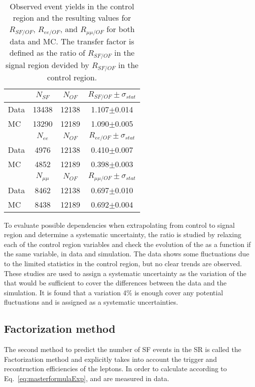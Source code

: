 \begin{table}[ht!]
\def\arraystretch{1.2}
\setlength{\belowcaptionskip}{6pt} 
\small                            
\centering                           
\caption{Observed event yields in the control region and the resulting values for $R_{SF/OF}$, $R_{ee/OF}$, and $R_{\mu\mu/OF}$ for both data and MC. 
The transfer factor is defined as the ratio of $R_{SF/OF}$ in the signal region devided by $R_{SF/OF}$ in the control region.}
\label{tab:rSFOF}
\begin{tabular}{ l c c c}
        \hline \hline
        & $N_{SF}$ & $N_{OF}$ & $ R_{SF/OF} \pm \sigma_{stat}$  \\    
        \hline
         Data & 13438 & 12138 & 1.107$\pm$0.014\\
         MC   & 13290 & 12189 & 1.090$\pm$0.005\\ 
        \hline
         & $N_{ee}$ & $N_{OF}$ & $ R_{ee/OF} \pm \sigma_{stat}$ \\    
        \hline
         Data & 4976 & 12138 & 0.410$\pm$0.007 \\
         MC   & 4852 & 12189 & 0.398$\pm$0.003 \\
        \hline
         & $N_{\mu\mu}$ & $N_{OF}$ & $ R_{\mu\mu/OF} \pm \sigma_{stat}$\\    
        \hline
         Data & 8462 & 12138 & 0.697$\pm$0.010 \\
         MC   & 8438 & 12189 & 0.692$\pm$0.004 \\ \hline\hline
\end{tabular}
\end{table}                                                                                                                                                                    
To evaluate possible dependencies when extrapolating from control to signal region and determine a systematic uncertainty, the ratio \Rsfof is studied by relaxing each of the control region variables and check the evolution of the \Rsfof as a function if the same variable, in data and simulation.  
The data shows some fluctuations due to the limited statistics in the control region, but no clear trends are observed.
These studies are used to assign a systematic uncertainty as the variation of the \Rsfof that would be sufficient to cover the differences between the data and the simulation. 
It is found that a variation 4\% is enough cover any potential fluctuations and is assigned as a systematic uncertainties. 
\subsection*{Factorization method}\label{sec:factorizationMethod}
\noindent
\justify
The second method to predict the number of SF events in the SR is called the Factorization method and explicitly takes into account the trigger and recontruction efficiencies of the leptons.   
In order to calculate \Rsfof according to Eq.~\ref{eq:masterformulaExp}, \rmue and \RT are measured in data.
